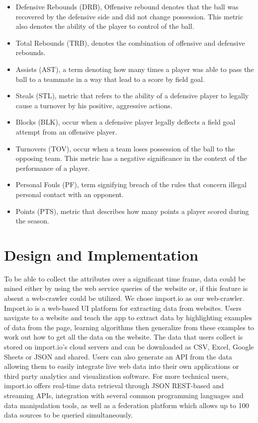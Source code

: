 \documentclass{acm_proc_article-sp}
\begin{document}
\begin{itemize}
\item Defensive Rebounds (DRB), Offensive rebound denotes that the ball was recovered by the defensive side and did not change possession. This metric also denotes the ability of the player to control of the ball.
\item Total Rebounds (TRB), denotes the combination of offensive and defensive rebounds.
\item Assists (AST), a term denoting how many times a player was able to pass the ball to a teammate in a way that lead to a score by field goal.
\item Steals (STL), metric that refers to the ability of a defensive player to legally cause a turnover by his positive, aggressive actions.
\item Blocks (BLK), occur when a defensive player legally deflects a field goal attempt from an offensive player.
\item Turnovers (TOV), occur when a team loses possession of the ball to the opposing team. This metric has a negative significance in the context of the performance of a player.
\item Personal Fouls (PF), term signifying breach of the rules that concern illegal personal contact with an opponent.
\item Points (PTS), metric that describes how many points a player scored during the season.    ~\cite{D} 
\end{itemize}

\section{Design and Implementation}
\vspace{0.5em}
To be able to collect the attributes over a significant time frame, data could be mined either by using the web service queries of the website or, if this feature is absent a web-crawler could be utilized. We chose import.io as our web-crawler.  Import.io is a web-based UI platform for extracting data from websites. Users navigate to a website and teach the app to extract data by highlighting examples of data from the page, learning algorithms then generalize from these examples to work out how to get all the data on the website. The data that users collect is stored on import.io's cloud servers and can be downloaded as CSV, Excel, Google Sheets or JSON and shared. Users can also generate an API from the data allowing them to easily integrate live web data into their own applications or third party analytics and visualization software. For more technical users, import.io offers real-time data retrieval through JSON REST-based and streaming APIs, integration with several common programming languages and data manipulation tools, as well as a federation platform which allows up to 100 data sources to be queried simultaneously.     ~\cite{E}
\end{document}

